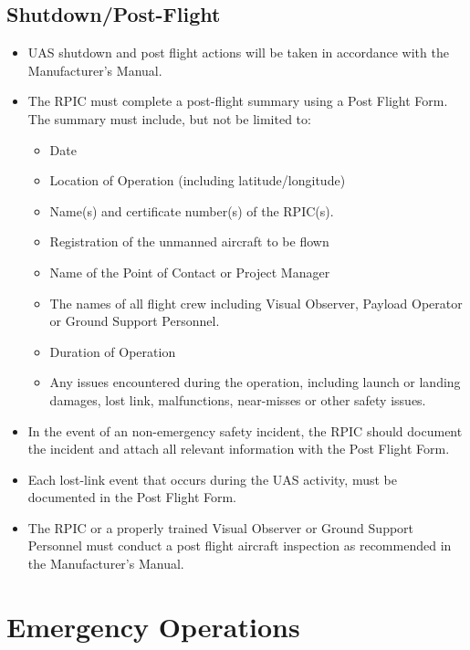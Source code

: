 \documentclass[
]{book}
\providecommand{\tightlist}{%
  \setlength{\itemsep}{0pt}\setlength{\parskip}{0pt}}
\begin{document}
\section{Shutdown/Post-Flight}\label{shutdownpost-flight}

\begin{itemize}
\item
  UAS shutdown and post flight actions will be taken in accordance with the Manufacturer's Manual.
\item
  The RPIC must complete a post-flight summary using a Post Flight Form. The summary must include, but not be limited to:

  \begin{itemize}
  \tightlist
  \item
    Date
  \item
    Location of Operation (including latitude/longitude)
  \item
    Name(s) and certificate number(s) of the RPIC(s).
  \item
    Registration of the unmanned aircraft to be flown
  \item
    Name of the Point of Contact or Project Manager
  \item
    The names of all flight crew including Visual Observer, Payload Operator or Ground Support Personnel.
  \item
    Duration of Operation
  \item
    Any issues encountered during the operation, including launch or landing damages, lost link, malfunctions, near-misses or other safety issues.
  \end{itemize}
\item
  In the event of an non-emergency safety incident, the RPIC should document the incident and attach all relevant information with the Post Flight Form.\\
\item
  Each lost-link event that occurs during the UAS activity, must be documented in the Post Flight Form.
\item
  The RPIC or a properly trained Visual Observer or Ground Support Personnel must conduct a post flight aircraft inspection as recommended in the Manufacturer's Manual.
\end{itemize}

\chapter{Emergency Operations}\label{emergency-operations}
\end{document}
